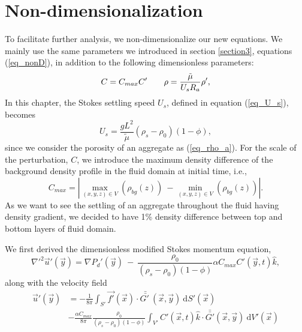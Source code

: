 \section{Non-dimensionalization}
To facilitate further analysis, we non-dimensionalize our new equations. We mainly use the same parameters we introduced in section \ref{section3}, equations (\ref{eq_nonD}), in addition to the following dimensionless parameters:
\begin{equation}
	C= C_{max} C'
\hspace{7mm}
\rho = \frac{\tilde{\mu}  }{{U_s} R_a}  \rho', 
\end{equation}
In this chapter, the Stokes settling speed $U_s$, defined in equation (\ref{eq_U_s}), becomes
\[
U_s = \frac{g  L^2}{\tilde{\mu}}(\rho_s - \rho_0)(1-\phi),
\] 
since we consider the porosity of an aggregate as (\ref{eq_rho_a}).
For the scale of the perturbation, $C$, we introduce the maximum density difference of the background density profile in the fluid domain at initial time, i.e., 
\[
C_{max} = 
\left|
\max_{(x,y,z) \in V} \left(\rho_{bg}(z)  \right)
\ - \min_{(x,y,z) \in V} \left(\rho_{bg}(z)  \right) \right|.
\] 
As we want to see the settling of an aggregate throughout the fluid having density gradient, we decided to have 1\% density difference between top and bottom layers of fluid domain.
\par
We first derived the dimensionless modified Stokes momentum equation,
\begin{equation}
	{\nabla'}^2  \vec{u}'(\vec{y})
	= \nabla {P_d}'(\vec{y}) \ - \  
	\frac{\rho_0}{(\rho_s - \rho_0)(1-\phi)} \alpha C_{max} C'\left(\vec{y},t \right)   \hat{k},
\label{eq_extra_C_nonD}
\end{equation}
along with the velocity field
 \begin{align}
		\vec{u}'(\vec{y})
			  & =- \frac{1}{8 \pi} \int_{S'}  
			 \vec{f'}(\vec{x}) 
			 \cdot \bar{\bar{G' \ }} (\vec{x},\vec{y}) 
			 \ \textrm{d}S'(\vec{x})
			 \nonumber \\
& -\frac{ \alpha C_{max}}{8\pi } \frac{\rho_0}{(\rho_s - \rho_0)(1-\phi)} 
\int_{V'} C' \left(\vec{x},  t \right) \hat{k} \cdot 
\bar{\bar{G'  }}(\vec{x}, \vec{y} ) 
\ \text{d}V'(\vec{x})
  \label{eq_vel_all_onS_nonD}
 \end{align}
